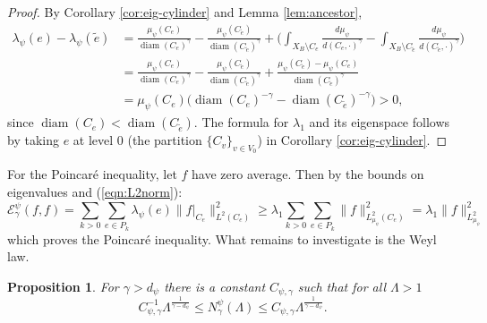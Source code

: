 \documentclass[12pt]{amsart}
\theoremstyle{plain}
\newtheorem{proposition}{Proposition}[section]
\theoremstyle{definition}
\begin{document}
\begin{proof}
By Corollary \ref{cor:eig-cylinder} and Lemma \ref{lem:ancestor},
\begin{align*}
\lambda_\psi(e)-\lambda_\psi(\tilde e)
&=\frac{\mu_\psi(C_e)}{\operatorname{diam}(C_e)^\gamma}-\frac{\mu_\psi(C_{\tilde e})}{\operatorname{diam}(C_{\tilde e})^\gamma}
+\Big(\int_{X_B\setminus C_e}\frac{d\mu_\psi}{d(C_e,\cdot)^\gamma}-\int_{X_B\setminus C_{\tilde e}}\frac{d\mu_\psi}{d(C_{\tilde e},\cdot)^\gamma}\Big)\\
&=\frac{\mu_\psi(C_e)}{\operatorname{diam}(C_e)^\gamma}-\frac{\mu_\psi(C_{\tilde e})}{\operatorname{diam}(C_{\tilde e})^\gamma}
+\frac{\mu_\psi(C_{\tilde e})-\mu_\psi(C_e)}{\operatorname{diam}(C_{\tilde e})^\gamma}\\
&=\mu_\psi(C_e)\Big(\operatorname{diam}(C_e)^{-\gamma}-\operatorname{diam}(C_{\tilde e})^{-\gamma}\Big)>0,
\end{align*}
since $\operatorname{diam}(C_e)<\operatorname{diam}(C_{\tilde e})$. The formula for $\lambda_1$ and its eigenspace follows by taking $e$ at level $0$ (the partition $\{C_v\}_{v\in V_0}$) in Corollary \ref{cor:eig-cylinder}.
\end{proof}
    For the Poincar\'e inequality, let $f$ have zero average. Then by the bounds on eigenvalues and (\ref{eqn:L2norm}):
    $$\mathcal{E}^\psi_\gamma (f,f) = \sum_{k>0} \sum_{e\in P_k}\lambda_\psi(e)\|f|_{C_e}\|^2_{L^2(C_e)}\geq \lambda_1 \sum_{k>0} \sum_{e\in P_k}\|f\|^2_{L^2_{\mu_\psi}(C_e)} = \lambda_1\|f\|^2_{L^2_{\mu_\psi}}$$
    which proves the Poincar\'e inequality. What remains to investigate is the Weyl law. 
    \begin{proposition}
    \label{prop:Weyl}
        For $\gamma>d_\psi$ there is a constant $C_{\psi,\gamma}$ such that for all $\Lambda>1$
        $$C^{-1}_{\psi,\gamma} \Lambda^{\frac{1}{\gamma - d_\psi}} \leq  N^\psi_\gamma(\Lambda)\leq C_{\psi,\gamma} \Lambda^{\frac{1}{\gamma - d_\psi}}.$$
    \end{proposition}
\end{document}
